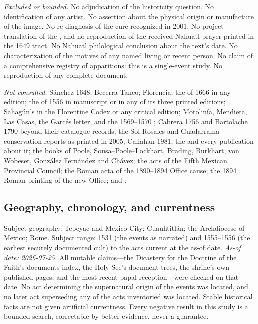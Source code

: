 \emph{Excluded or bounded.} No adjudication of the historicity
question. No identification of any artist. No assertion about the
physical origin or manufacture of the image. No re-diagnosis of the
cure recognized in 2001. No project translation of the
, and no reproduction of the received Nahuatl
prayer printed in the 1649 tract. No Nahuatl philological conclusion
about the text's date. No characterization of the motives of any named
living or recent person. No claim of a comprehensive registry of
apparitions: this is a single-event study. No reproduction of any
complete document.

\emph{Not consulted.} S\'anchez 1648; Becerra Tanco; Florencia; the
 of 1666 in any edition; the
 of 1556 in manuscript or in any of its three
printed editions; Sahag\'un's  in the Florentine
Codex or any critical edition; Motolin\'ia, Mendieta, Las Casas, the
Garc\'es letter, and the 1569--1570 ; Cabrera 1756 and Bartolache 1790 beyond their catalogue
records; the Sol Rosales and Guadarrama conservation reports as
printed in 2005; Callahan 1981; the  and every
publication about it; the books of Poole, Sousa--Poole--Lockhart,
Brading, Burkhart, von Wobeser, Gonz\'alez Fern\'andez and Ch\'avez;
the acts of the Fifth Mexican Provincial Council; the Roman acta of
the 1890--1894 Office cause; the 1894 Roman printing of the new Office;
and .

\subsection*{Geography, chronology, and currentness}

Subject geography: Tepeyac and Mexico City; Cuauhtitl\'an; the
Archdiocese of Mexico; Rome. Subject range: 1531 (the events as
narrated) and 1555--1556 (the earliest securely documented cult) to
the acts current at the as-of date. \emph{As-of date: 2026-07-25.} All
mutable claims---the Dicastery for the Doctrine of the Faith's
documents index, the Holy See's document trees, the shrine's own
published pages, and the most recent papal reception---were checked on
that date. No act determining the supernatural origin of the events
was located, and no later act superseding any of the acts inventoried
was located. Stable historical facts are not given artificial
currentness. Every negative result in this study is a bounded search,
correctable by better evidence, never a guarantee.

